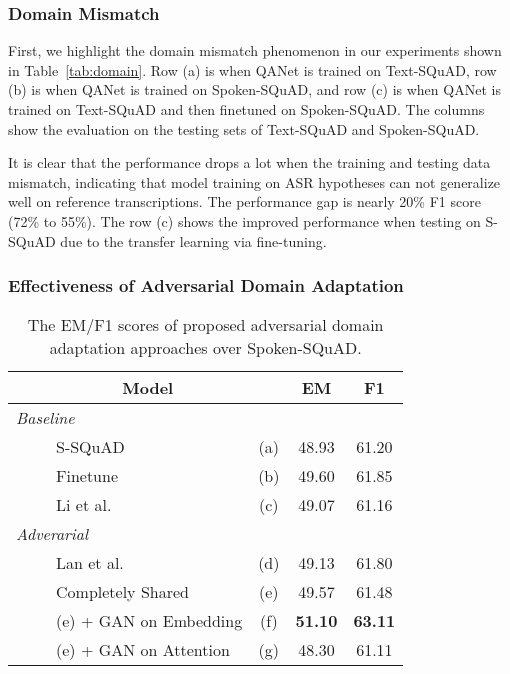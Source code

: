 \documentclass{article}
\begin{document}
\subsubsection{Domain Mismatch}
First, we highlight the domain mismatch phenomenon in our experiments shown in Table~\ref{tab:domain}.
Row (a) is when QANet is trained on Text-SQuAD, row (b) is when QANet is trained on Spoken-SQuAD, and row (c) is when QANet is trained on Text-SQuAD and then finetuned on Spoken-SQuAD. 
The columns show the evaluation on the testing sets of Text-SQuAD and Spoken-SQuAD. 

It is clear that the performance drops a lot when the training and testing data mismatch, indicating that model training on ASR hypotheses can not generalize well on reference transcriptions.
The performance gap is nearly 20\% F1 score (72\% to 55\%).
The row (c) shows the improved performance when testing on S-SQuAD due to the transfer learning via fine-tuning.



\subsubsection{Effectiveness of Adversarial Domain Adaptation}

\begin{table}[t!]
\centering
\caption{The EM/F1 scores of proposed adversarial domain adaptation approaches over Spoken-SQuAD.}
\label{tab:GAN}
\vspace{2mm}
\begin{tabular}{|lccc|}
\hline
\multicolumn{2}{|c|}{{\textbf{Model}}}  & \textbf{EM} & \textbf{F1}  \\
\hline
\hline
\emph{Baseline} & & &\\
~~~~~S-SQuAD & (a) & 48.93 & 61.20 \\
~~~~~Finetune & (b) & 49.60 & 61.85 \\
~~~~~Li et al.~\cite{li2018spoken} & (c)  & 49.07 & 61.16 \\
\hline
\emph{Adverarial} & & &\\
~~~~~Lan et al.~\cite{lan2018semi} & (d) & 49.13 & 61.80 \\
~~~~~Completely Shared & (e) & 49.57 & 61.48 \\
~~~~~(e) + GAN on Embedding & (f) & \textbf{51.10} & \textbf{63.11} \\
~~~~~(e) + GAN on Attention & (g) & 48.30 & 61.11 \\
\hline
\end{tabular}
\end{table}
\end{document}
